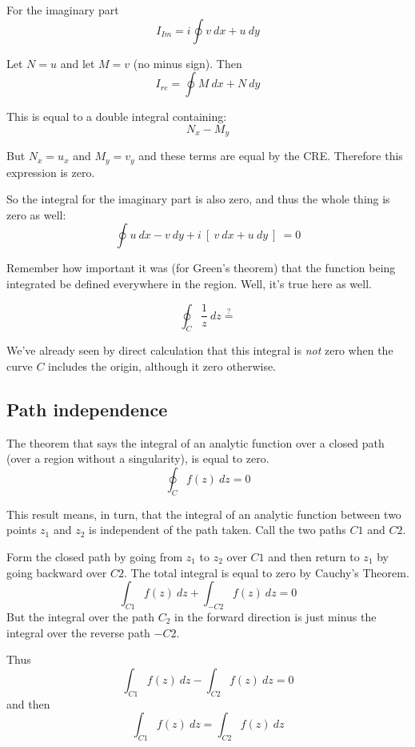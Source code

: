 \documentclass[11pt, oneside]{article}
\begin{document}
For the imaginary part 
\[ I_{Im} = i \oint v \ dx + u \ dy \]

Let $N = u$ and let $M = v$ (no minus sign).  Then
\[ I_{re} = \oint M \ dx + N \ dy \]

This is equal to a double integral containing:
\[ N_x - M_y \]

But $N_x = u_x$ and $M_y = v_y$ and these terms are equal by the CRE.  Therefore this expression is zero.

So the integral for the imaginary part is also zero, and thus the whole thing is zero as well:
\[ \oint u \ dx - v \ dy + i \ [ \  v \ dx + u \ dy \ ] \ = 0 \]

Remember how important it was (for Green's theorem) that the function being integrated be defined everywhere in the region.  Well, it's true here as well.

\[ \oint_C \frac{1}{z} \ dz \stackrel{?}{=}  \]

We've already seen by direct calculation that this integral is \emph{not} zero when the curve $C$ includes the origin, although it zero otherwise.

\subsection*{Path independence}
The theorem that says the integral of an analytic function over a closed path (over a region without a singularity), is equal to zero.
\[ \oint_C f(z) \ dz = 0 \]

This result means, in turn, that the integral of an analytic function between two points $z_1$ and $z_2$ is independent of the path taken.  Call the two paths $C1$ and $C2$.  

Form the closed path by going from $z_1$ to $z_2$ over $C1$ and then return to $z_1$ by going backward over $C2$.  The total integral is equal to zero by Cauchy's Theorem.
\[ \int_{C1} f(z) \ dz + \int_{-C2} f(z) \ dz = 0 \]
But the integral over the path $C_2$ in the forward direction is just minus the integral over the reverse path $-C2$.

Thus
\[ \int_{C1} f(z) \ dz - \int_{C2} f(z) \ dz = 0 \]
and then
\[ \int_{C1} f(z) \ dz = \int_{C2} f(z) \ dz \]
\end{document}
